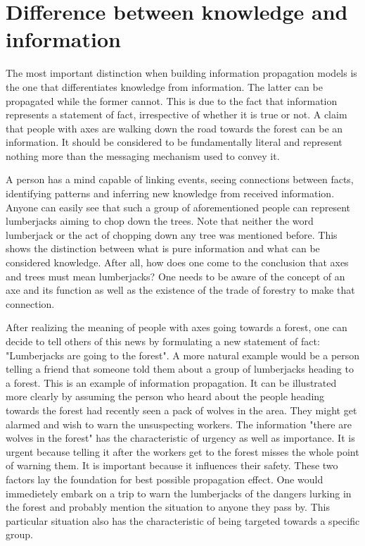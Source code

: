 \section{Difference between knowledge and information}

The most important distinction when building information propagation models is the one that differentiates knowledge from information.
The latter can be propagated while the former cannot.
This is due to the fact that information represents a statement of fact, irrespective of whether it is true or not.
A claim that people with axes are walking down the road towards the forest can be an information.
It should be considered to be fundamentally literal and represent nothing more than the messaging mechanism used to convey it.

A person has a mind capable of linking events, seeing connections between facts, identifying patterns and inferring new knowledge from received information.
Anyone can easily see that such a group of aforementioned people can represent lumberjacks aiming to chop down the trees.
Note that neither the word lumberjack or the act of chopping down any tree was mentioned before.
This shows the distinction between what is pure information and what can be considered knowledge.
After all, how does one come to the conclusion that axes and trees must mean lumberjacks?
One needs to be aware of the concept of an axe and its function as well as the existence of the trade of forestry to make that connection.

After realizing the meaning of people with axes going towards a forest, one can decide to tell others of this news by formulating a new statement of fact: "Lumberjacks are going to the forest".
A more natural example would be a person telling a friend that someone told them about a group of lumberjacks heading to a forest.
This is an example of information propagation.
It can be illustrated more clearly by assuming the person who heard about the people heading towards the forest had recently seen a pack of wolves in the area.
They might get alarmed and wish to warn the unsuspecting workers.
The information "there are wolves in the forest" has the characteristic of urgency as well as importance.
It is urgent because telling it after the workers get to the forest misses the whole point of warning them.
It is important because it influences their safety.
These two factors lay the foundation for best possible propagation effect.
One would immedietely embark on a trip to warn the lumberjacks of the dangers lurking in the forest and probably mention the situation to anyone they pass by.
This particular situation also has the characteristic of being targeted towards a specific group.

